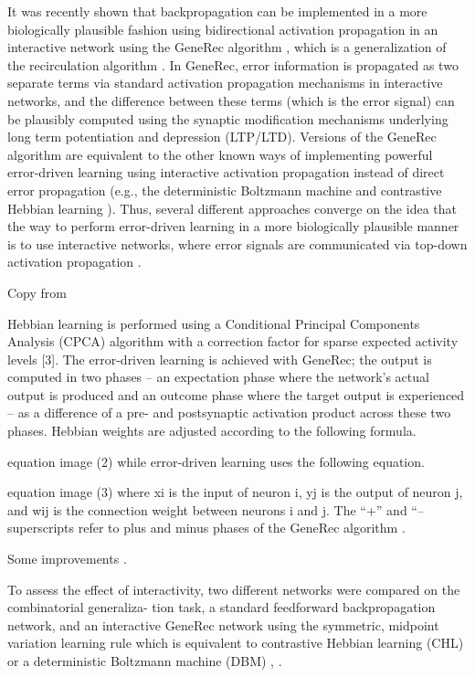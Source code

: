 It was recently shown that backpropagation can be implemented in a more biologically plausible fashion using bidirectional activation propagation in an interactive network using the GeneRec algorithm \cite{o1996bio}, which is a generalization of the recirculation algorithm \cite{hinton1988learning}. In GeneRec, error information is propagated as two separate terms via standard activation propagation mechanisms in interactive networks, and the difference between these terms (which is the error signal) can be plausibly computed using the synaptic modification mechanisms underlying long term potentiation and depression (LTP/LTD). Versions of the GeneRec algorithm are equivalent to the other known ways of implementing powerful error-driven learning using interactive activation propagation instead of direct error propagation (e.g., the deterministic Boltzmann machine \cite{hinton1989deterministic} and contrastive Hebbian learning \cite{movellan1990contrastive}). Thus, several different approaches converge on the idea that the way to perform error-driven learning in a more biologically plausible manner is to use interactive networks, where error signals are communicated via top-down activation propagation \cite{o2001generalization}.

Copy from \cite{da2011advances} 


Hebbian learning is performed using a Conditional Principal Components Analysis (CPCA) algorithm with a correction factor for sparse expected activity levels [3]. The error-driven learning is achieved with GeneRec; the output is computed in two phases – an expectation phase where the network's actual output is produced and an outcome phase where the target output is experienced – as a difference of a pre- and postsynaptic activation product across these two phases. Hebbian weights are adjusted according to the following formula.

equation image	(2)
while error-driven learning uses the following equation.

equation image	(3)
where xi is the input of neuron i, yj is the output of neuron j, and wij is the connection weight between neurons i and j. The “+” and “– superscripts refer to plus and minus phases of the GeneRec algorithm \cite{nawrocki2012monitoring}.


Some improvements \cite{da2008biological}. 


To assess the effect of interactivity, two different networks were compared on the combinatorial generaliza-
tion task, a standard feedforward backpropagation network, and an interactive GeneRec network using the
symmetric, midpoint variation learning rule which is equivalent to contrastive Hebbian learning (CHL) or a
deterministic Boltzmann machine (DBM) \cite{o1996bio}, \cite{o2001generalization}. 

